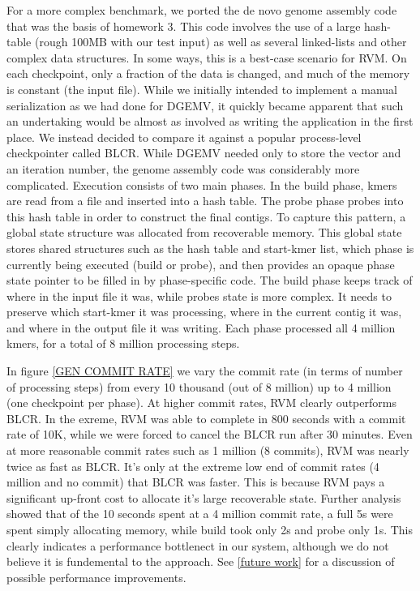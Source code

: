 For a more complex benchmark, we ported the de novo genome assembly code that
was the basis of homework 3. This code involves the use of a large hash-table
(rough 100MB with our test input) as well as several linked-lists and other
complex data structures. In some ways, this is a best-case scenario for RVM. On
each checkpoint, only a fraction of the data is changed, and much of the memory
is constant (the input file). While we initially intended to implement a manual
serialization as we had done for DGEMV, it quickly became apparent that such an
undertaking would be almost as involved as writing the application in the first
place. We instead decided to compare it against a popular process-level
checkpointer called BLCR\cite{BLCR}. While DGEMV needed only to store the vector
and an iteration number, the genome assembly code was considerably more
complicated. Execution consists of two main phases. In the build phase, kmers
are read from a file and inserted into a hash table. The probe phase probes into
this hash table in order to construct the final contigs. To capture this
pattern, a global state structure was allocated from recoverable memory. This
global state stores shared structures such as the hash table and start-kmer
list, which phase is currently being executed (build or probe), and then
provides an opaque phase state pointer to be filled in by phase-specific code.
 The build phase keeps track of where in the input file it was, while probes
state is more complex. It needs to preserve which start-kmer it was
processing, where in the current contig it was, and where in the output file it
was writing. Each phase processed all 4 million kmers, for a total of 8 million
processing steps.

In figure \ref{GEN COMMIT RATE} we vary the commit rate (in terms of number of
processing steps) from every 10 thousand (out of 8 million) up to 4 million
(one checkpoint per phase). At higher commit rates, RVM clearly outperforms
BLCR. In the exreme, RVM was able to complete in 800 seconds with a commit rate
of 10K, while we were forced to cancel the BLCR run after 30 minutes. Even at
more reasonable commit rates such as 1 million (8 commits), RVM was nearly twice
as fast as BLCR. It's only at the extreme low end of commit rates (4 million
and no commit) that BLCR was faster. This is because RVM pays a significant
up-front cost to allocate it's large recoverable state. Further analysis showed
that of the 10 seconds spent at a 4 million commit rate, a full 5s were spent
simply allocating memory, while build took only 2s and probe only 1s. This
clearly indicates a performance bottlenect in our system, although we do not
believe it is fundemental to the approach. See \ref{future work} for a
discussion of possible performance improvements. 
